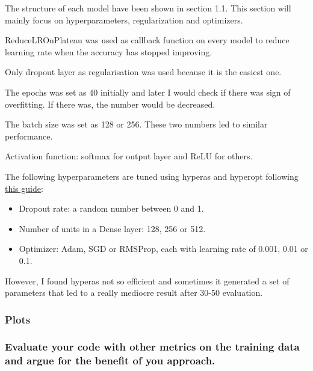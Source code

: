 \documentclass[12pt]{article}
\begin{document}
The structure of each model have been shown in section 1.1. This section will mainly focus on hyperparameters, regularization and optimizers.

ReduceLROnPlateau was used as callback function on every model to reduce learning rate when the accuracy has stopped improving.

Only dropout layer as regularisation was used because it is the easiest one.

The epochs was set as 40 initially and later I would check if there was sign of overfitting. If there was, the number would be decreased.

The batch size was set as 128 or 256. These two numbers led to similar performance.

Activation function: softmax for output layer and ReLU for others.

The following hyperparameters are tuned using hyperas and hyperopt following \href{https://towardsdatascience.com/a-guide-to-an-efficient-way-to-build-neural-network-architectures-part-ii-hyper-parameter-42efca01e5d7}{this guide}:
\begin{itemize}
  \item Dropout rate: a random number between 0 and 1.
  \item Number of units in a Dense layer: 128, 256 or 512.
  \item Optimizer: Adam, SGD or RMSProp, each with learning rate of 0.001, 0.01 or 0.1.
\end{itemize}

However, I found hyperas not so efficient and sometimes it generated a set of parameters that led to a really mediocre result after 30-50 evaluation.

\subsubsection{Plots}

\subsubsection{Evaluate your code with other metrics on the training data and argue for the benefit of you approach.}
\end{document}

